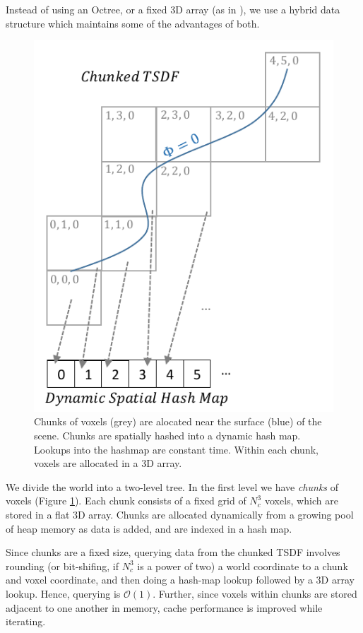 \documentclass[conference,10pt]{IEEEtran}
\begin{document}
Instead of using an Octree, or a fixed 3D array (as in \cite{Newcombe,
Whelan2013}), we use a hybrid data structure which maintains some of the
advantages of both. 

\begin{figure}[t]
  \centering
    \includegraphics[width=0.95\columnwidth]{img/chunks.pdf}
      \caption{Chunks of voxels (grey) are alocated near the surface (blue) of
      the scene. Chunks are spatially hashed into a dynamic hash map. Lookups
      into the hashmap are constant time. Within each chunk, voxels are
      allocated in a 3D array.}
  \label{fig:chunks} 
\end{figure} 

We divide the world into a two-level tree. In the first level we have
\emph{chunks} of voxels (Figure \ref{fig:chunks}). Each chunk consists of a
fixed grid of $N_c^3$ voxels, which are stored in a flat 3D array. Chunks are
allocated dynamically from a growing pool of heap memory as data is added, and
are indexed in a hash map.

Since chunks are a fixed size, querying data from the chunked TSDF involves
rounding (or bit-shifing, if $N_c^3$ is a power of two) a world coordinate to a
chunk and voxel coordinate, and then doing a hash-map lookup followed by a 3D
array lookup. Hence, querying is $\mathcal{O}(1)$. Further, since voxels within
chunks are stored adjacent to one another in memory, cache performance is
improved while iterating.
\end{document}
